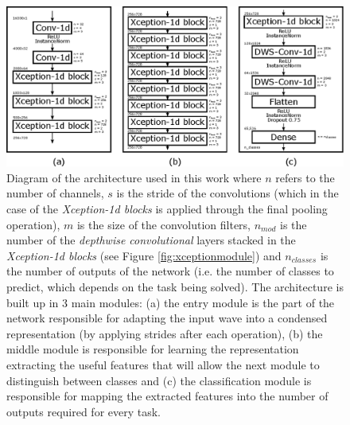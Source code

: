 \documentclass[review]{elsarticle}
\begin{document}
\begin{figure}[ht]
	\centering
	\includegraphics[width=1.0\linewidth]{img/arch.eps}
	\caption{Diagram of the architecture used in this work where $n$ refers to the number of channels, $s$ is the stride of the convolutions (which in the case of the \textit{Xception-1d blocks} is applied through the final pooling operation), $m$ is the size of the convolution filters, $n_{mod}$ is the number of the \textit{depthwise convolutional} layers stacked in the \textit{Xception-1d blocks} (see Figure \ref{fig:xceptionmodule}) and $n_{classes}$ is the number of outputs of the network (i.e. the number of classes to predict, which depends on the task being solved). The architecture is built up in 3 main modules: (a) the entry module is the part of the network responsible for adapting the input wave into a condensed representation (by applying strides after each operation), (b) the middle module is responsible for learning the representation extracting the useful features that will allow the next module to distinguish between classes and (c) the classification module is responsible for mapping the extracted features into the number of outputs required for every task.}
	\label{fig:arch}
\end{figure}
\end{document}
